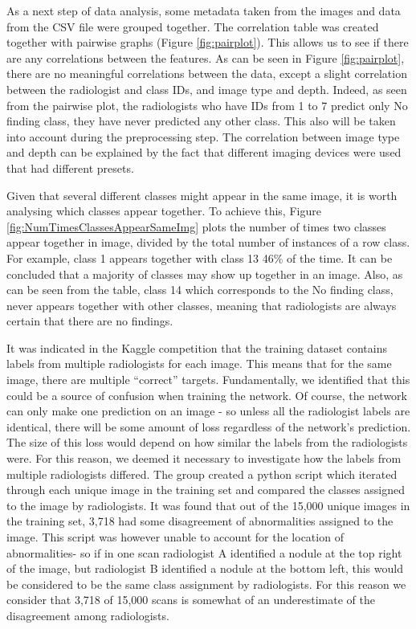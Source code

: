 \documentclass[conference]{IEEEtran}
\begin{document}
As a next step of data analysis, some metadata taken from the images and data from the CSV file were grouped together. The correlation table was created together with pairwise graphs (Figure \ref{fig:pairplot}). This allows us to see if there are any correlations between the features. As can be seen in Figure \ref{fig:pairplot}, there are no meaningful correlations between the data, except a slight correlation between the radiologist and class IDs, and image type and depth.  Indeed, as seen from the pairwise plot, the radiologists who have IDs from 1 to 7 predict only No finding class, they have never predicted any other class. This also will be taken into account during the preprocessing step. The correlation between image type and depth can be explained by the fact that different imaging devices were used that had different presets.

Given that several different classes might appear in the same image, it is worth analysing which classes appear together. To achieve this, Figure \ref{fig:NumTimesClassesAppearSameImg} plots the number of times two classes appear together in image, divided by the total number of instances of a row class. For example, class 1 appears together with class 13 46\% of the time. It can be concluded that a majority of classes may show up together in an image. Also, as can be seen from the table, class 14 which corresponds to the No finding class, never appears together with other classes, meaning that radiologists are always certain that there are no findings. 

It was indicated in the Kaggle competition that the training dataset contains labels from multiple radiologists for each image. This means that for the same image, there are multiple “correct” targets. Fundamentally, we identified that this could be a source of confusion when training the network. Of course, the network can only make one prediction on an image - so unless all the radiologist labels are identical, there will be some amount of loss regardless of the network's prediction. The size of this loss would depend on how similar the labels from the radiologists were. For this reason, we deemed it necessary to investigate how the labels from multiple radiologists differed. The group created a python script which iterated through each unique image in the training set and compared the classes assigned to the image by radiologists. It was found that out of the 15,000 unique images in the training set, 3,718 had some disagreement of abnormalities assigned to the image. This script was however unable to account for the location of abnormalities- so if in one scan radiologist A identified a nodule at the top right of the image, but radiologist B identified a nodule at the bottom left, this would be considered to be the same class assignment by radiologists. For this reason we consider that 3,718 of 15,000 scans is somewhat of an underestimate of the disagreement among radiologists.
\end{document}
